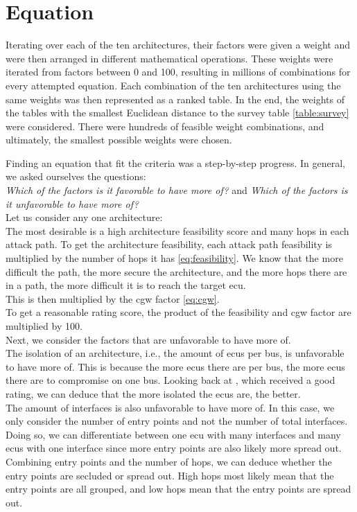 \section{Equation}
\label{sec:equation}

Iterating over each of the ten architectures, their factors were given a weight and were then arranged in different mathematical operations.
These weights were iterated from factors between 0 and 100, resulting in millions of combinations for every attempted equation.
Each combination of the ten architectures using the same weights was then represented as a ranked table. 
In the end, the weights of the tables with the smallest Euclidean distance to the survey table \ref{table:survey} were considered.
There were hundreds of feasible weight combinations, and ultimately, the smallest possible weights were chosen.

Finding an equation that fit the criteria was a step-by-step progress.
In general, we asked ourselves the questions:\\
\textit{Which of the factors is it favorable to have more of?} and \textit{Which of the factors is it unfavorable to have more of?}\\

Let us consider any one architecture:\\
The most desirable is a high architecture feasibility score and many hops in each attack path.
To get the architecture feasibility, each attack path feasibility is multiplied by the number of hops it has \ref{eq:feasibility}.
We know that the more difficult the path, the more secure the architecture, and the more hops there are in a path, the more difficult it is to reach the target \acrshort{ecu}.\\
This is then multiplied by the \acrshort{cgw} factor \ref{eq:cgw}.\\
To get a reasonable rating score, the product of the feasibility and \acrshort{cgw} factor are multiplied by 100.\\

Next, we consider the factors that are unfavorable to have more of.\\
The isolation of an architecture, i.e., the amount of \acrshort{ecu}s per bus, is unfavorable to have more of.
This is because the more \acrshort{ecu}s there are per bus, the more \acrshort{ecu}s there are to compromise on one bus.
Looking back at , which received a good rating, we can deduce that the more isolated the \acrshort{ecu}s are, the better.\\
The amount of interfaces is also unfavorable to have more of.
In this case, we only consider the number of entry points and not the number of total interfaces.
Doing so, we can differentiate between one \acrshort{ecu} with many interfaces and many \acrshort{ecu}s with one interface since more entry points are also likely more spread out.
Combining entry points and the number of hops, we can deduce whether the entry points are secluded or spread out.
High hops most likely mean that the entry points are all grouped, and low hops mean that the entry points are spread out.\\

